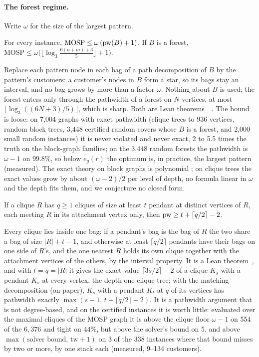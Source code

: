 \paragraph{The forest regime.}
Write $\omega$ for the size of the largest pattern.
\begin{theorem}[blow-up]
\label{thm:blowup}
For every instance, $\mathrm{MOSP}\le\omega\,(\mathrm{pw}(B)+1)$. If $B$ is a forest,
$\mathrm{MOSP}\le\omega\bigl(\lfloor\log_{3}\tfrac{6(n+m)+3}{5}\rfloor+1\bigr)$.
\end{theorem}
Replace each pattern node in each bag of a path decomposition of $B$ by the
pattern's customers: a customer's nodes in $B$ form a star, so its bags stay
an interval, and no bag grows by more than a factor $\omega$. Nothing about
$B$ is used; the forest enters only through the pathwidth of a forest on $N$
vertices, at most $\lfloor\log_{3}((6N+3)/5)\rfloor$, which is sharp. Both are
Lean theorems~~. The bound is loose: on 7,004
graphs with exact pathwidth (clique trees to 936 vertices, random block trees,
3,448 certified random covers whose $B$ is a forest, and 2,000 small random
instances) it is never violated and never exact, 2 to 5.5 times the truth on
the block-graph families; on the 3,448 random forests the pathwidth is
$\omega-1$ on $99.8\%$, so below $e_g(r)$ the optimum is, in practice, the
largest pattern (measured). The exact theory on block graphs is polynomial
\citep{ChouKoHoChen2008}; on clique trees the exact values grow by about
$(\omega-2)/2$ per level of depth, no formula linear in $\omega$ and the depth
fits them, and we conjecture no closed form.

\begin{lemma}
\label{lem:pendant}
If a clique $R$ has $q\ge1$ cliques of size at least $t$ pendant at distinct
vertices of $R$, each meeting $R$ in its attachment vertex only, then
$\mathrm{pw}\ge t+\lceil q/2\rceil-2$.
\end{lemma}
Every clique lies inside one bag; if a pendant's bag is the bag of $R$ the two
share a bag of size $|R|+t-1$, and otherwise at least $\lceil q/2\rceil$
pendants have their bags on one side of $R$'s, and the one nearest $R$ holds
its own clique together with the attachment vertices of the others, by the
interval property. It is a Lean theorem~, and with
$t=q=|R|$ it gives the exact value $\lceil 3s/2\rceil-2$ of a clique $K_s$
with a pendant $K_s$ at every vertex, the depth-one clique tree; with the
matching decomposition (on paper), $K_s$ with a pendant $K_t$ at $q$ of its
vertices has pathwidth exactly $\max(s-1,\,t+\lceil q/2\rceil-2)$. It is a
pathwidth argument that is not degree-based, and on the certified instances
it is worth little: evaluated over the maximal cliques of the MOSP graph it is
above the clique floor $\omega-1$ on 554 of the $6{,}376$ and tight on
$44\%$, but above the solver's bound on 5, and above $\max(\text{solver
bound},\,\mathrm{tw}+1)$ on 3 of the 338 instances where that bound misses by
two or more, by one stack each (measured, 9--134 customers).

